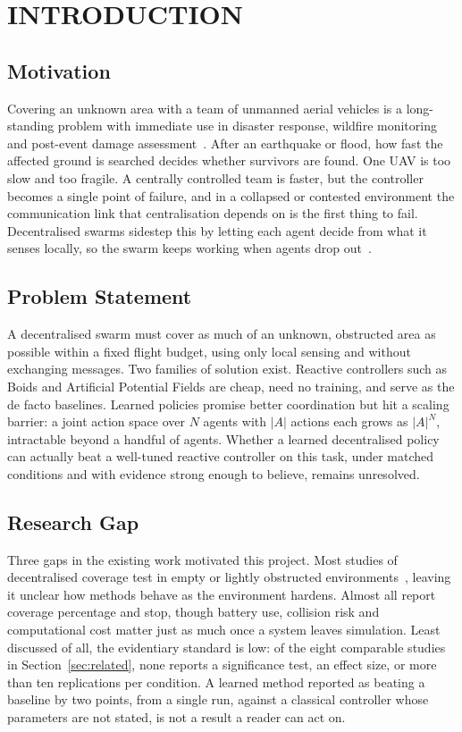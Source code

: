 \documentclass[a4paper, 10pt, conference]{ieeeconf}
\begin{document}
\section{INTRODUCTION}\label{sec:intro}

\subsection{Motivation}

Covering an unknown area with a team of unmanned aerial vehicles is a
long-standing problem with immediate use in disaster response,
wildfire monitoring and post-event damage
assessment~\cite{erdelj2017}. After an earthquake or flood, how fast
the affected ground is searched decides whether survivors are found.
One UAV is too slow and too fragile. A centrally controlled team is
faster, but the controller becomes a single point of failure, and in a
collapsed or contested environment the communication link that
centralisation depends on is the first thing to fail. Decentralised
swarms sidestep this by letting each agent decide from what it senses
locally, so the swarm keeps working when agents drop
out~\cite{dorigo2021}.

\subsection{Problem Statement}

A decentralised swarm must cover as much of an unknown, obstructed
area as possible within a fixed flight budget, using only local
sensing and without exchanging messages. Two families of solution
exist. Reactive controllers such as Boids and Artificial Potential
Fields are cheap, need no training, and serve as the de facto
baselines. Learned policies promise better coordination but hit a
scaling barrier: a joint action space over $N$ agents with $|A|$
actions each grows as $|A|^N$, intractable beyond a handful of agents.
Whether a learned decentralised policy can actually beat a well-tuned
reactive controller on this task, under matched conditions and with
evidence strong enough to believe, remains unresolved.

\subsection{Research Gap}

Three gaps in the existing work motivated this project. Most studies
of decentralised coverage test in empty or lightly obstructed
environments~\cite{zhu2023}, leaving it unclear how methods behave as
the environment hardens. Almost all report coverage percentage and
stop, though battery use, collision risk and computational cost matter
just as much once a system leaves simulation. Least discussed of all,
the evidentiary standard is low: of the eight comparable studies in
Section~\ref{sec:related}, none reports a significance test, an effect
size, or more than ten replications per condition. A learned method
reported as beating a baseline by two points, from a single run,
against a classical controller whose parameters are not stated, is not
a result a reader can act on.
\end{document}
